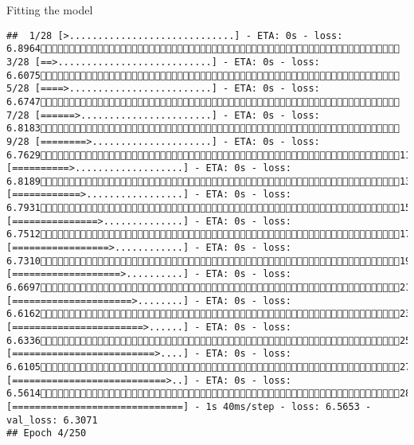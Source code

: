 \documentclass[
  ignorenonframetext,
]{beamer}
\begin{document}
\begin{frame}[fragile]{Fitting the model}
\begin{verbatim}
##  1/28 [>.............................] - ETA: 0s - loss: 6.8964 3/28 [==>...........................] - ETA: 0s - loss: 6.6075 5/28 [====>.........................] - ETA: 0s - loss: 6.6747 7/28 [======>.......................] - ETA: 0s - loss: 6.8183 9/28 [========>.....................] - ETA: 0s - loss: 6.762911/28 [==========>...................] - ETA: 0s - loss: 6.818913/28 [============>.................] - ETA: 0s - loss: 6.793115/28 [===============>..............] - ETA: 0s - loss: 6.751217/28 [=================>............] - ETA: 0s - loss: 6.731019/28 [===================>..........] - ETA: 0s - loss: 6.669721/28 [=====================>........] - ETA: 0s - loss: 6.616223/28 [=======================>......] - ETA: 0s - loss: 6.633625/28 [=========================>....] - ETA: 0s - loss: 6.610527/28 [===========================>..] - ETA: 0s - loss: 6.561428/28 [==============================] - 1s 40ms/step - loss: 6.5653 - val_loss: 6.3071
## Epoch 4/250

\end{verbatim}
\end{frame}
\end{document}
